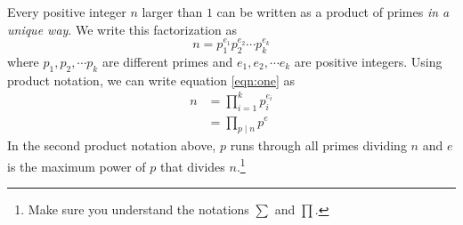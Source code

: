 \documentclass{subfile}
\begin{document}
	\begin{theorem}
		Every positive integer $n$ larger than $1$ can be written as a product of primes \textit{in a unique way}. We write this factorization as
		\begin{equation}
			n=p_1^{e_1}p_2^{e_2}\cdots p_k^{e_k}\label{eqn:one}
		\end{equation}
		where $p_1,p_2,\cdots p_k$ are different primes and $e_1,e_2,\cdots e_k$ are positive integers. Using product notation, we can write equation \eqref{eqn:one} as
		\begin{align*}
			n
				&=\prod\limits_{i=1}^{k}p_i^{e_i}\\
				& =\prod\limits_{p\mid n}p^e
		\end{align*}
		In the second product notation above, $p$ runs through all primes dividing $n$ and $e$ is the maximum power of $p$ that divides $n$.\footnote{Make sure you understand the notations $\sum$ and $\prod$.}
	\end{theorem}
\end{document}
